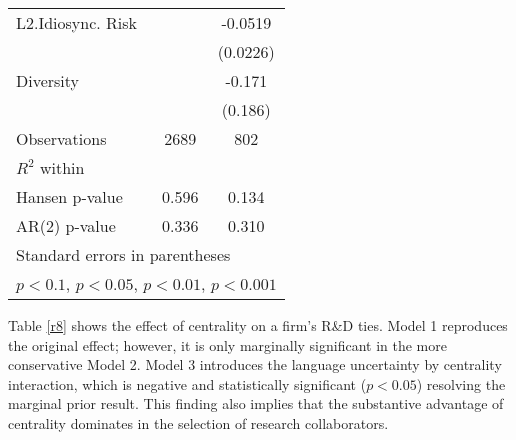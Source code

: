 \begin{table}[htbp]
{\begin{tabular}{l*{2}{c}}
L2.Idiosync. Risk   &                     &     -0.0519\sym{*}  \\
                    &                     &    (0.0226)         \\
Diversity           &                     &      -0.171         \\
                    &                     &     (0.186)         \\
\hline
Observations        &        2689         &         802         \\
$R^2$ within                &                     &                     \\
Hansen p-value             &       0.596         &       0.134         \\
AR(2) p-value                &       0.336         &       0.310         \\
\hline\hline
\multicolumn{3}{l}{\footnotesize Standard errors in parentheses}\\
\multicolumn{3}{l}{\footnotesize \sym{+} \(p<0.1\), \sym{*} \(p<0.05\), \sym{**} \(p<0.01\), \sym{***} \(p<0.001\)}\\
\end{tabular}
}
\end{table}

Table \ref{r8} shows the effect of centrality on a firm's R\&D ties. Model 1 reproduces the original effect; however, it is only marginally significant in the more conservative Model 2. Model 3 introduces the language uncertainty by centrality interaction, which is negative and statistically significant ($p<0.05$) resolving the marginal prior result. This finding also implies that the substantive advantage of centrality dominates in the selection of research collaborators.

